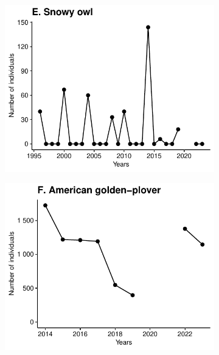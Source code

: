 \documentclass[a4paper,twoside,12pt]{article}
\begin{document}
\begin{figure}[h]
  \centering
  \begin{subfigure}{0.45\textwidth}
    \includegraphics[width=\linewidth]{figures/species_temporal_series/Snowy_owl.pdf}
  \end{subfigure}
  \begin{subfigure}{0.45\textwidth}
    \includegraphics[width=\linewidth]{figures/species_temporal_series/American_golden-plover.pdf}
  \end{subfigure} 
    \hfill
    \hfill
  \begin{subfigure}{0.45\textwidth}

\end{subfigure}
\end{figure}
\end{document}
